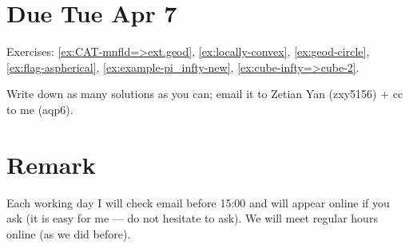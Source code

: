 \section{Due Tue Apr 7}

Exercises: 
\ref{ex:CAT-mnfld=>ext.geod},
\ref{ex:locally-convex},
\ref{ex:geod-circle},
\ref{ex:flag-aspherical},
\ref{ex:example-pi_infty-new},
\ref{ex:cube-infty=>cube-2}.

Write down as many solutions as you can; email it to Zetian Yan (zxy5156) + cc to me (aqp6).

\section*{Remark}
Each working day I will check email before 15:00 and will appear online if you ask (it is easy for me --- do not hesitate to ask).
We will meet regular hours online (as we did before).
